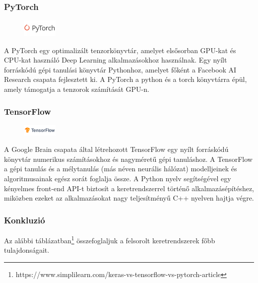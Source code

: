 \documentclass[12pt,a4]{article}
\begin{document}
	\vspace{-15pt} \leavevmode\subsubsection{PyTorch}
	\begin{figure}
		\centering
		\includegraphics[width=0.15\textwidth]{pytorch}
	\end{figure}

	A PyTorch egy optimalizált tenzorkönyvtár, amelyet elsősorban GPU-kat és CPU-kat használó Deep Learning alkalmazásokhoz használnak. Egy nyílt forráskódú gépi tanulási könyvtár Pythonhoz, amelyet főként a Facebook AI Research csapata fejlesztett ki.
	A PyTorch a python és a torch könyvtárra épül, amely támogatja a tenzorok számítását GPU-n.
	
	\vspace{-15pt} \leavevmode\subsubsection{TensorFlow}
	\begin{figure}
		\centering
		\includegraphics[width=0.15\textwidth]{tensorflow}
	\end{figure}

	A Google Brain csapata által létrehozott TensorFlow egy nyílt forráskódú könyvtár numerikus számításokhoz és nagyméretű gépi tanuláshoz. A TensorFlow a gépi tanulás és a mélytanulás (más néven neurális hálózat) modelljeinek és algoritmusainak egész sorát foglalja össze. A Python nyelv segítségével egy kényelmes front-end API-t biztosít a keretrendszerrel történő alkalmazásépítéshez, miközben ezeket az alkalmazásokat nagy teljesítményű C++ nyelven hajtja végre.
	
	\vspace{-15pt} \leavevmode\subsubsection{Konkluzió}
	
	Az alábbi táblázatban\footnote{https://www.simplilearn.com/keras-vs-tensorflow-vs-pytorch-article} összefoglaljuk a felsorolt keretrendszerek főbb tulajdonságait.
	
\end{document}
